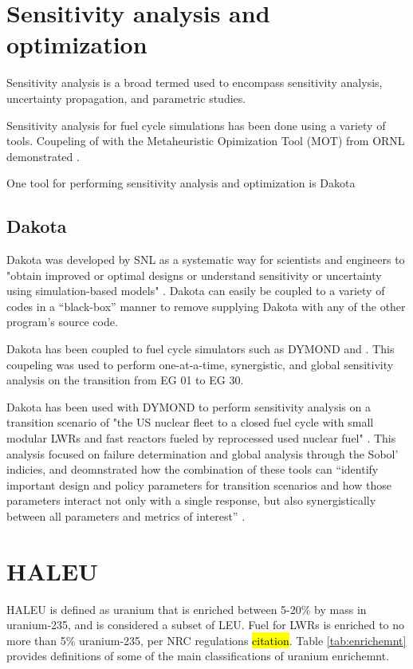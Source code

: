 \section{Sensitivity analysis and optimization}
Sensitivity analysis is a broad termed used to encompass sensitivity analysis, 
uncertainty propagation, and parametric studies. 

Sensitivity analysis for fuel cycle simulations has been done using a variety of 
tools. Coupeling of \Cyclus with the Metaheuristic Opimization Tool (MOT) from 
\gls{ORNL} demonstrated \cite{feng_sensitivity_2020}. 

One tool for performing sensitivity analysis and optimization is 
Dakota \cite{adams_dakota_2019}

\subsection{Dakota}
Dakota was developed by \gls{SNL} as a systematic way for scientists and 
engineers to "obtain improved or optimal designs or understand sensitivity
or uncertainty using simulation-based models" \cite{adams_dakota_2019}.
Dakota can easily be coupled to a variety of codes in a ``black-box'' manner
to remove supplying Dakota with any of the other program's source code. 

Dakota has been coupled to fuel cycle simulators such as \gls{DYMOND} and \Cyclus 
\cite{chee_sensitivity_2019}. This coupeling was used to perform one-at-a-time, 
synergistic, and global sensitivity analysis on the transition from \gls{EG} 01
to \gls{EG} 30. 

Dakota has been used with \gls{DYMOND} to perform sensitivity analysis on a transition
scenario of "the US nuclear fleet to a closed fuel cycle with small modular 
\glspl{LWR} and fast reactors fueled by reprocessed used nuclear fuel" 
\cite{richards_application_2021}. This analysis focused on failure determination
and global analysis through the Sobol' indicies, and deomnstrated how the 
combination of these tools can ``identify important design and policy parameters
for transition scenarios and how those parameters interact not only with a single 
response, but also synergistically between all parameters and metrics of 
interest'' \cite{richards_application_2021}. 


\section{HALEU}
\gls{HALEU} is defined as uranium that is enriched between 5-20\% by mass in 
uranium-235, and is considered a subset of \gls{LEU}. Fuel for \glspl{LWR} 
is enriched to no more than 5\% uranium-235, per \gls{NRC} regulations 
\hl{citation}. Table \ref{tab:enrichemnt} provides definitions of some of the 
main classifications of uranium enrichemnt. 

